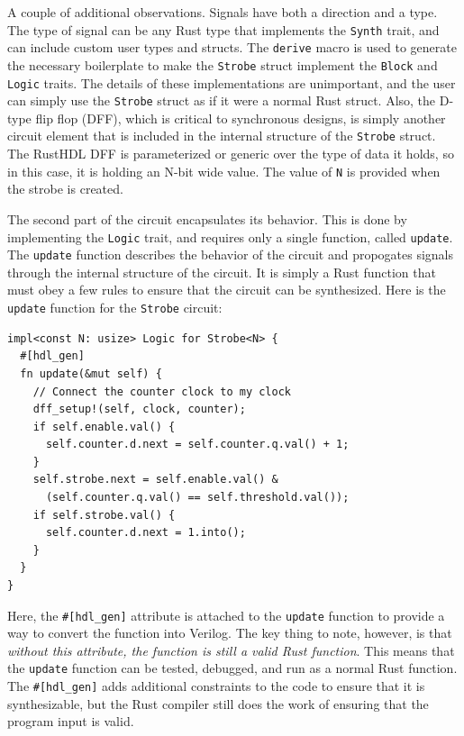 \documentclass[conference]{IEEEtran}
\begin{document}
A couple of additional observations.  Signals have both a direction and a type.  The type of
signal can be any Rust type that implements the \verb|Synth| trait, and can include custom user
types and structs.  The \verb|derive| macro is used to generate the necessary boilerplate to make the 
\verb|Strobe| struct implement the \verb|Block| and \verb|Logic| traits.  The details of these implementations are
unimportant, and the user can simply use the \verb|Strobe| struct as if it were a normal Rust struct.  Also,
the D-type flip flop (DFF), which is critical to synchronous designs, is simply another circuit element that
is included in the internal structure of the \verb|Strobe| struct.  The RustHDL DFF is parameterized or 
generic over the type of data it holds, so in this case, it is holding an N-bit wide value.  The value of
\verb|N| is provided when the strobe is created.

The second part of the circuit encapsulates its behavior.  This is done by implementing the \verb|Logic| trait,
and requires only a single function, called \verb|update|.  The \verb|update| function describes the behavior
of the circuit and propogates signals through the internal structure of the circuit.  It is simply a Rust function
that must obey a few rules to ensure that the circuit can be synthesized.  Here is the \verb|update| function for
the \verb|Strobe| circuit:

\begin{verbatim}
impl<const N: usize> Logic for Strobe<N> {
  #[hdl_gen]
  fn update(&mut self) {
    // Connect the counter clock to my clock
    dff_setup!(self, clock, counter);
    if self.enable.val() {
      self.counter.d.next = self.counter.q.val() + 1;
    }
    self.strobe.next = self.enable.val() & 
      (self.counter.q.val() == self.threshold.val());
    if self.strobe.val() {
      self.counter.d.next = 1.into();
    }
  }
}
\end{verbatim}

Here, the \verb|#[hdl_gen]| attribute is attached to the \verb|update| function to provide a way to convert the function
into Verilog.  The key thing to note, however, is that \emph{without this attribute, the function is still a valid Rust function}.
This means that the \verb|update| function can be tested, debugged, and run as a normal Rust function.  The \verb|#[hdl_gen]| adds
additional constraints to the code to ensure that it is synthesizable, but the Rust compiler still does the work of ensuring that the 
program input is valid.
\end{document}
